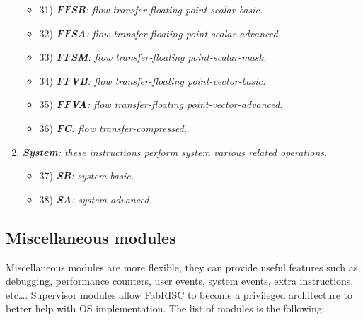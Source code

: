 \begin{enumerate}
\begin{itemize}
                    \item 31) \textit{\textbf{FFSB}: flow transfer-floating point-scalar-basic.}
                    \item 32) \textit{\textbf{FFSA}: flow transfer-floating point-scalar-advanced.}
                    \item 33) \textit{\textbf{FFSM}: flow transfer-floating point-scalar-mask.}

                    \item 34) \textit{\textbf{FFVB}: flow transfer-floating point-vector-basic.}
                    \item 35) \textit{\textbf{FFVA}: flow transfer-floating point-vector-advanced.}

                    \item 36) \textit{\textbf{FC}: flow transfer-compressed.}

                \end{itemize}

            \item \textit{\textbf{System}: these instructions perform system various related operations.}

                \begin{itemize}

                    \item 37) \textit{\textbf{SB}: system-basic.}
                    \item 38) \textit{\textbf{SA}: system-advanced.}

                \end{itemize}

        \end{enumerate}

    \subsection{Miscellaneous modules}

        Miscellaneous modules are more flexible, they can provide useful features such as debugging, performance counters, user events, system events, extra instructions, etc\ldots. Supervisor modules allow FabRISC to become a privileged architecture to better help with OS implementation. The list of modules is the following:

